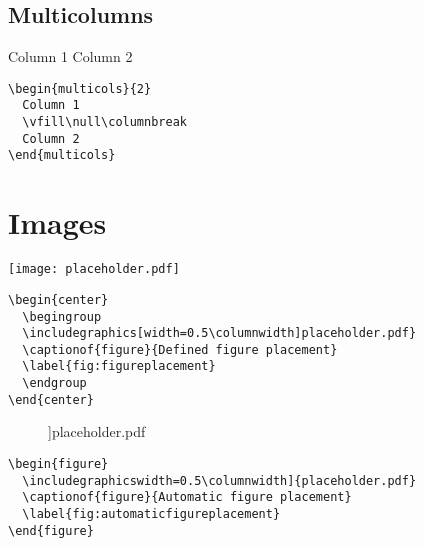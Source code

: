 \documentclass[a4paper,11pt,fleqn]{book}
\begin{document}
\begin{enumerate}
\subsection{Multicolumns}
\begin{multicols}{2}
  \begin{multicols}{2}
    Column 1
    \vfill\null\columnbreak
    Column 2
  \end{multicols}

  \vfill\null\columnbreak

  \begin{verbatim}
\begin{multicols}{2}
  Column 1
  \vfill\null\columnbreak
  Column 2
\end{multicols}
  \end{verbatim}
\end{multicols}

\newpage
\section{Images}

\begin{multicols}{2}
  \begin{center}
    \begingroup
    \texttt{[image: placeholder.pdf]}
    \label{fig:figureplacement}
    \endgroup
  \end{center}

  \vfill\null\columnbreak

  \begin{verbatim}
\begin{center}
  \begingroup
  \includegraphics[width=0.5\columnwidth]placeholder.pdf}
  \captionof{figure}{Defined figure placement}
  \label{fig:figureplacement}
  \endgroup
\end{center}
  \end{verbatim}
\end{multicols}

\begin{multicols}{2}
  \begin{figure}
    \columnwidth]{placeholder.pdf}
    \label{fig:automaticfigureplacement}
  \end{figure}

  \vfill\null\columnbreak
  \begin{verbatim}
\begin{figure}
  \includegraphicswidth=0.5\columnwidth]{placeholder.pdf}
  \captionof{figure}{Automatic figure placement}
  \label{fig:automaticfigureplacement}
\end{figure}
  \end{verbatim}
\end{multicols}


\end{enumerate}
\end{document}
